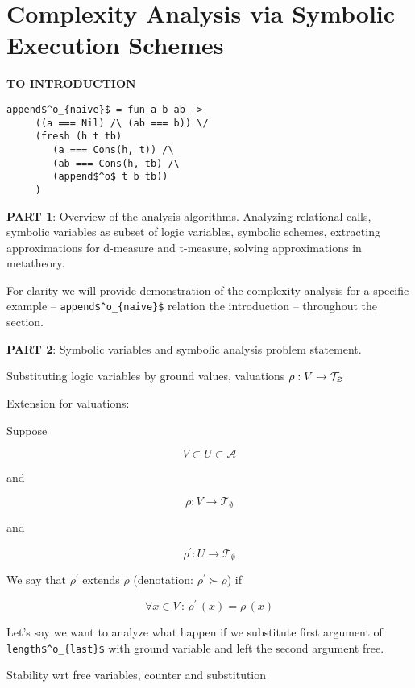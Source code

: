 \section{Complexity Analysis via Symbolic Execution Schemes}
\label{sec:symbolic}

\colorbox{yellow!20}{\textbf{TO INTRODUCTION}}
\begin{lstlisting}[basicstyle=\small]
   append$^o_{naive}$ = fun a b ab ->
     ((a === Nil) /\ (ab === b)) \/
     (fresh (h t tb)
        (a === Cons(h, t)) /\
        (ab === Cons(h, tb) /\
        (append$^o$ t b tb)) 
     )
\end{lstlisting}

\colorbox{blue!20}{\parbox{\textwidth}{\textbf{PART 1}: Overview of the analysis algorithms.
Analyzing relational calls, symbolic variables as subset of logic variables, symbolic schemes, extracting approximations for d-measure and t-measure, solving approximations in metatheory.}}

For clarity we will provide demonstration of the complexity analysis for a specific example -- \lstinline|append$^o_{naive}$| relation the introduction  -- throughout the section.

\colorbox{blue!20}{\parbox{\textwidth}{\textbf{PART 2}: Symbolic variables and symbolic analysis problem statement.}}

\colorbox{blue!20}{\parbox{\textwidth}{Substituting logic variables by ground values, valuations $\rho : V \to \mathcal{T}_{\varnothing}$}}

Extension for valuations:

\begin{definition}
  Suppose

  \[V \subset U \subset \mathcal{A}\]

  and

  \[\rho \colon V \to \mathcal{T}_{\emptyset}\]

  and

  \[\rho^\prime \colon U \to \mathcal{T}_{\emptyset}\]

  We say that $\rho^\prime$ extends $\rho$ (denotation: $ \rho^\prime \succ \rho$) if
  
\[ \forall x \in V \,:\, \rho^\prime\,(x) = \rho\,(x) \]
\end{definition}

Let's say we want to analyze what happen if we substitute first argument of \lstinline|length$^o_{last}$| with ground variable and left the second argument free.

\colorbox{blue!20}{\parbox{\textwidth}{Stability wrt free variables, counter and substitution}}

